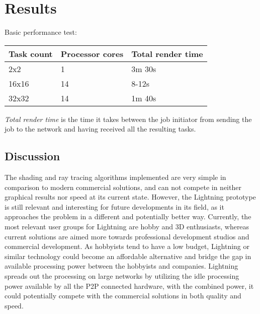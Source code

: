 \chapter{Results}

Basic performance test:
\begin{center}
    \begin{tabular}{ | l | l | l |} \hline
    Task count & Processor cores & Total render time \\ \hline
    2x2 & 1 & 3m 30s \\ \hline
    16x16 & 14 & 8-12s \\ \hline
    32x32 & 14 & 1m 40s \\ \hline
    \end{tabular}
    
    \emph{Total render time} is the time it takes between the job initiator from sending the job to the network and having received all the resulting tasks.
\end{center}

\section{Discussion}



The shading and ray tracing algorithms implemented are very simple in comparison to modern commercial solutions, and can not compete in neither graphical results nor speed at its current state. However, the Lightning prototype is still relevant and interesting for future developments in its field, as it approaches the problem in a different and potentially better way. Currently, the most relevant user groups for Lightning are hobby and 3D enthusiasts, whereas current solutions are aimed more towards professional development studios and commercial development. As hobbyists tend to have a low budget, Lightning or similar technology could become an affordable alternative and bridge the gap in available processing power between the hobbyists and companies. Lightning spreads out the processing on large networks by utilizing the idle processing power available by all the P2P connected hardware, with the combined power, it could potentially compete with the commercial solutions in both quality and speed.

